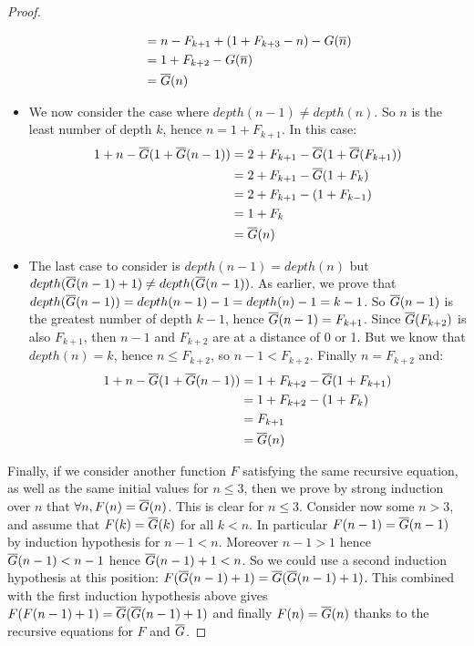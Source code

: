 \documentclass[a4paper,11pt]{article}
\begin{document}
\begin{proof}
\begin{itemize}
\begin{align*}
                    & = n-F_{k+1}+(1+F_{k+3}-n)-G(\overline{n}) \\
                    & = 1+F_{k+2}-G(\overline{n}) \\
                    & = \overline{G}(n)
\end{align*}
\item We now consider the case where $depth(n-1)\neq depth(n)$.
So $n$ is the least number of depth $k$, hence $n=1+F_{k+1}$.
In this case:
\begin{align*}
1+n-\overline{G}(1+\overline{G}(n-1)) & = 2+F_{k+1}-\overline{G}(1+\overline{G}(F_{k+1})) \\
                    & = 2+F_{k+1}-\overline{G}(1+F_{k}) \\
                    & = 2+F_{k+1}-(1+F_{k-1}) \\
                    & = 1+F_{k} \\
                    & = \overline{G}(n)
\end{align*}
\item The last case to consider is $depth(n-1)=depth(n)$ but
$depth(\overline{G}(n-1)+1)\neq depth(\overline{G}(n-1))$. As earlier, we prove
that $depth(\overline{G}(n-1))=depth(n-1)-1=depth(n)-1=k-1$. So
$\overline{G}(n-1)$ is the greatest number of depth $k-1$, hence
$\overline{G}(n-1)=F_{k+1}$. Since $\overline{G}(F_{k+2})$ is also $F_{k+1}$, then $n-1$
and $F_{k+2}$ are at a distance of 0 or 1. But we know that
$depth(n)=k$, hence $n \le F_{k+2}$, so $n-1 < F_{k+2}$.
Finally $n=F_{k+2}$ and:
\begin{align*}
1+n-\overline{G}(1+\overline{G}(n-1)) & = 1+F_{k+2}-\overline{G}(1+F_{k+1}) \\
                    & = 1+F_{k+2}-(1+F_{k}) \\
                    & = F_{k+1} \\
                    & = \overline{G}(n)
\end{align*}
\end{itemize}

Finally, if we consider another function $F$ satisfying
the same recursive equation, as well as the same initial values
for $n\le 3$, then we prove by strong induction over $n$ that
$\forall n, F(n)=\overline{G}(n)$. This is clear for $n\le 3$. Consider now
some $n>3$, and assume that $F(k)=\overline{G}(k)$ for all $k<n$.
In particular $F(n-1)=\overline{G}(n-1)$ by induction hypothesis for
$n-1<n$.
Moreover $n-1>1$ hence $\overline{G}(n-1) < n-1$ hence $\overline{G}(n-1)+1<n$.
So we could use a second induction hypothesis at this position:
$F(\overline{G}(n-1)+1)=\overline{G}(\overline{G}(n-1)+1)$. This combined with the first
induction hypothesis above gives $F(F(n-1)+1)=\overline{G}(\overline{G}(n-1)+1)$
and finally $F(n)=\overline{G}(n)$ thanks to the recursive equations
for $F$ and $\overline{G}$.
\end{proof}
\end{document}
